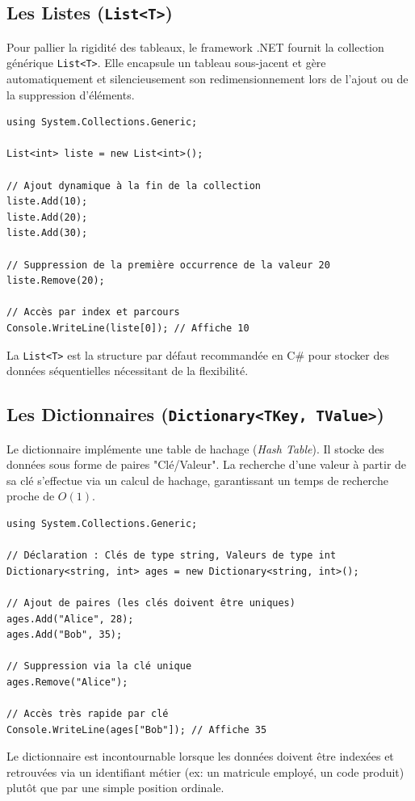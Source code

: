 \subsection{Les Listes (\texttt{List<T>})}
Pour pallier la rigidité des tableaux, le framework .NET fournit la collection générique \texttt{List<T>}. Elle encapsule un tableau sous-jacent et gère automatiquement et silencieusement son redimensionnement lors de l'ajout ou de la suppression d'éléments.

\begin{lstlisting}[style=csharpstyle]
using System.Collections.Generic;

List<int> liste = new List<int>();

// Ajout dynamique à la fin de la collection
liste.Add(10);
liste.Add(20);
liste.Add(30);

// Suppression de la première occurrence de la valeur 20
liste.Remove(20);

// Accès par index et parcours
Console.WriteLine(liste[0]); // Affiche 10
\end{lstlisting}

La \texttt{List<T>} est la structure par défaut recommandée en C\# pour stocker des données séquentielles nécessitant de la flexibilité.

\subsection{Les Dictionnaires (\texttt{Dictionary<TKey, TValue>})}
Le dictionnaire implémente une table de hachage (\textit{Hash Table}). Il stocke des données sous forme de paires "Clé/Valeur". La recherche d'une valeur à partir de sa clé s'effectue via un calcul de hachage, garantissant un temps de recherche proche de $O(1)$.

\begin{lstlisting}[style=csharpstyle]
using System.Collections.Generic;

// Déclaration : Clés de type string, Valeurs de type int
Dictionary<string, int> ages = new Dictionary<string, int>();

// Ajout de paires (les clés doivent être uniques)
ages.Add("Alice", 28);
ages.Add("Bob", 35);

// Suppression via la clé unique
ages.Remove("Alice");

// Accès très rapide par clé
Console.WriteLine(ages["Bob"]); // Affiche 35
\end{lstlisting}

Le dictionnaire est incontournable lorsque les données doivent être indexées et retrouvées via un identifiant métier (ex: un matricule employé, un code produit) plutôt que par une simple position ordinale.

